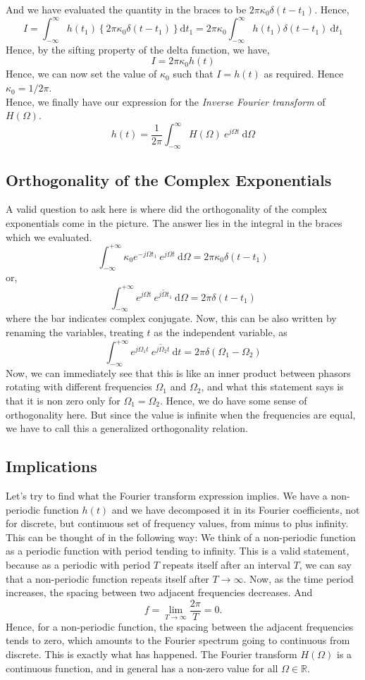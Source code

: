 And we have evaluated the quantity in the braces to be $2\pi\kappa_0\delta(t-t_1)$. Hence,
\[
I = \int_{-\infty}^{\infty} \! h(t_1)\left\lbrace 2\pi\kappa_0\delta(t-t_1) \right\rbrace \mathrm{d}t_1 = 2\pi\kappa_0 \int_{-\infty}^{\infty} \! h(t_1) \delta(t-t_1)\ \mathrm{d}t_1
\]
Hence, by the sifting property of the delta function, we have,
\[
I = 2\pi\kappa_0 h(t)
\]
Hence, we can now set the value of $\kappa_0$ such that $I = h(t)$ as required. Hence $\kappa_0 = 1/2\pi$.\\
Hence, we finally have our expression for the \emph{Inverse Fourier transform} of $H(\Omega)$.
\[
h(t) = \frac{1}{2\pi}\int_{-\infty}^{\infty} \! H(\Omega)\  e^{j\Omega t} \ \mathrm{d}\Omega
\]
\subsection{Orthogonality of the Complex Exponentials}
A valid question to ask here is where did the orthogonality of the complex exponentials come in the picture. The answer lies in the integral in the braces which we evaluated.
\[
\int_{-\infty}^{+\infty} \! \kappa_0 e^{-j\Omega t_1} \  e^{j\Omega t} \ \mathrm{d}\Omega = 2\pi\kappa_0 \delta(t-t_1)
\]
or,
\[
\int_{-\infty}^{+\infty} \! e^{j\Omega t} \ \overline{e^{j\Omega t_1}} \ \mathrm{d}\Omega = 2\pi \delta(t-t_1)
\]
where the bar indicates complex conjugate. Now, this can be also written by renaming the variables, treating $t$ as the independent variable, as
\[
\int_{-\infty}^{+\infty} \! e^{j\Omega_1 t} \ \overline{e^{j\Omega_2 t}} \ \mathrm{d}t = 2\pi \delta(\Omega_1-\Omega_2)
\]
Now, we can immediately see that this is like an inner product between phasors rotating with different frequencies $\Omega_1$ and $\Omega_2$, and what this statement says is that it is non zero only for $\Omega_1=\Omega_2$. Hence, we do have some sense of orthogonality here. But since the value is infinite when the frequencies are equal, we have to call this a generalized orthogonality relation.
\subsection {Implications} 
Let's try to find what the Fourier transform expression implies. We have a non-periodic function $h(t)$ and we have decomposed it in its Fourier coefficients, not for discrete, but continuous set of frequency values, from minus to plus infinity. This can be thought of in the following way: We think of a non-periodic function as a periodic function with period tending to infinity. This is a valid statement, because as a periodic with period $T$ repeats itself after an interval $T$, we can say that a non-periodic function repeats itself after $T \to \infty$. Now, as the time period increases, the spacing between two adjacent frequencies decreases. And
\[
f = \lim_{T\to\infty}\frac{2\pi}{T} = 0.
\]
Hence, for a non-periodic function, the spacing between the adjacent frequencies tends to zero, which amounts to the Fourier spectrum going to continuous from discrete. This is exactly what has happened. The Fourier transform $H(\Omega)$ is a continuous function, and in general has a non-zero value for all $\Omega \in \mathbb{R}$.





